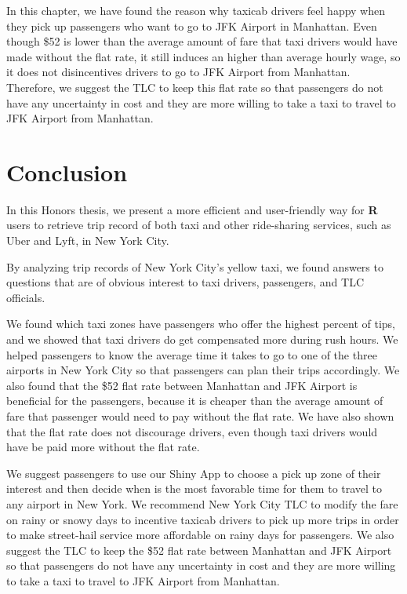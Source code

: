 \documentclass[12pt,twoside]{reedthesis}
\theoremstyle{definition}
\theoremstyle{definition}
\theoremstyle{definition}
\theoremstyle{remark}
\begin{document}
In this chapter, we have found the reason why taxicab drivers feel happy
when they pick up passengers who want to go to JFK Airport in Manhattan.
Even though \$52 is lower than the average amount of fare that taxi
drivers would have made without the flat rate, it still induces an
higher than average hourly wage, so it does not disincentives drivers to
go to JFK Airport from Manhattan. Therefore, we suggest the TLC to keep
this flat rate so that passengers do not have any uncertainty in cost
and they are more willing to take a taxi to travel to JFK Airport from
Manhattan.

\chapter{Conclusion}\label{chapter6}

In this Honors thesis, we present a more efficient and user-friendly way
for \textbf{R} users to retrieve trip record of both taxi and other
ride-sharing services, such as Uber and Lyft, in New York City.

By analyzing trip records of New York City's yellow taxi, we found
answers to questions that are of obvious interest to taxi drivers,
passengers, and TLC officials.

We found which taxi zones have passengers who offer the highest percent
of tips, and we showed that taxi drivers do get compensated more during
rush hours. We helped passengers to know the average time it takes to go
to one of the three airports in New York City so that passengers can
plan their trips accordingly. We also found that the \$52 flat rate
between Manhattan and JFK Airport is beneficial for the passengers,
because it is cheaper than the average amount of fare that passenger
would need to pay without the flat rate. We have also shown that the
flat rate does not discourage drivers, even though taxi drivers would
have be paid more without the flat rate.

We suggest passengers to use our Shiny App to choose a pick up zone of
their interest and then decide when is the most favorable time for them
to travel to any airport in New York. We recommend New York City TLC to
modify the fare on rainy or snowy days to incentive taxicab drivers to
pick up more trips in order to make street-hail service more affordable
on rainy days for passengers. We also suggest the TLC to keep the \$52
flat rate between Manhattan and JFK Airport so that passengers do not
have any uncertainty in cost and they are more willing to take a taxi to
travel to JFK Airport from Manhattan.
\end{document}
